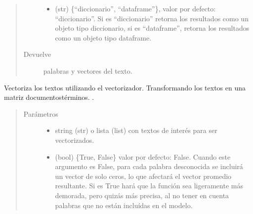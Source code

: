 \documentclass[letterpaper,10pt,openany,spanish]{sphinxmanual}
\begin{document}
\begin{fulllineitems}
\begin{fulllineitems}
\begin{quote}
\begin{description}
\begin{itemize}
\item {} 
 \textendash{} (str) \{“diccionario”, “dataframe”\}, valor por defecto: 
“diccionario”. Si es “diccionario” retorna los resultados como 
un objeto tipo diccionario, si es “dataframe”, retorna los 
resultados como un objeto tipo dataframe.

\end{itemize}

\item[{Devuelve}] \leavevmode
palabras y vectores del texto.

\end{description}\end{quote}

\end{fulllineitems}


\begin{fulllineitems}
\label{\detokenize{funciones/vectorizacion:vectorizacion.VectorizadorWord2Vec.vectorizar}}
Vectoriza los textos utilizando el vectorizador. 
Transformando los textos en una matriz documentos\sphinxhyphen{}términos. 
.
\begin{quote}\begin{description}
\item[{Parámetros}] \leavevmode\begin{itemize}
\item {} 
 \textendash{} string (str) o lista (list) con textos de interés 
para ser vectorizados.

\item {} 
 \textendash{} (bool) \{True, False\} valor por defecto: False. 
Cuando este argumento es False, para cada palabra desconocida 
se incluirá un vector de solo ceros, lo que afectará el vector 
promedio resultante. Si es True hará que la función sea 
ligeramente más demorada, pero quizás más precisa, al no tener 
en cuenta palabras que no están incluídas en el modelo.


\end{itemize}
\end{description}
\end{quote}
\end{fulllineitems}
\end{fulllineitems}
\end{document}

